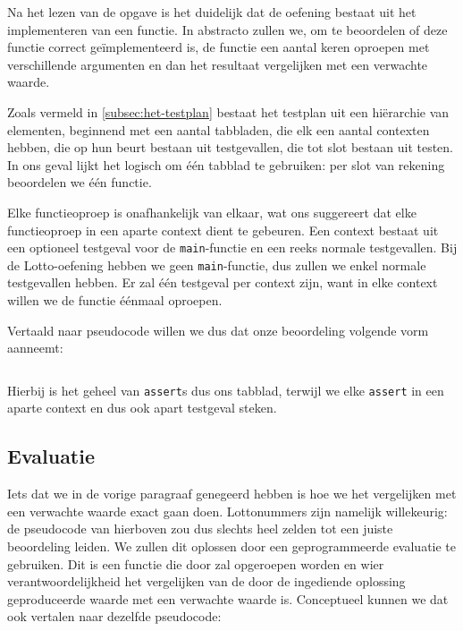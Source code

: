 Na het lezen van de opgave is het duidelijk dat de oefening bestaat uit het implementeren van een functie.
In abstracto zullen we, om te beoordelen of deze functie correct geïmplementeerd is, de functie een aantal keren oproepen met verschillende argumenten en dan het resultaat vergelijken met een verwachte waarde.

Zoals vermeld in \cref{subsec:het-testplan} bestaat het testplan uit een hiërarchie van elementen, beginnend met een aantal tabbladen, die elk een aantal contexten hebben, die op hun beurt bestaan uit testgevallen, die tot slot bestaan uit testen.
In ons geval lijkt het logisch om één tabblad te gebruiken: per slot van rekening beoordelen we één functie.

Elke functieoproep is onafhankelijk van elkaar, wat ons suggereert dat elke functieoproep in een aparte context dient te gebeuren.
Een context bestaat uit een optioneel testgeval voor de \texttt{main}-functie en een reeks normale testgevallen.
Bij de Lotto-oefening hebben we geen \texttt{main}-functie, dus zullen we enkel normale testgevallen hebben.
Er zal één testgeval per context zijn, want in elke context willen we de functie éénmaal oproepen.

Vertaald naar pseudocode willen we dus dat onze beoordeling volgende vorm aanneemt:

\inputminted{python}{code/lotto-eval.py}

Hierbij is het geheel van \texttt{assert}s dus ons tabblad, terwijl we elke \texttt{assert} in een aparte context en dus ook apart testgeval steken.

\subsection{Evaluatie}\label{subsec:oefening-lotto-evaluatie}

Iets dat we in de vorige paragraaf genegeerd hebben is hoe we het vergelijken met een verwachte waarde exact gaan doen.
Lottonummers zijn namelijk willekeurig: de pseudocode van hierboven zou dus slechts heel zelden tot een juiste beoordeling leiden.
We zullen dit oplossen door een geprogrammeerde evaluatie te gebruiken.
Dit is een functie die door \tested{} zal opgeroepen worden en wier verantwoordelijkheid het vergelijken van de door de ingediende oplossing geproduceerde waarde met een verwachte waarde is.
Conceptueel kunnen we dat ook vertalen naar dezelfde pseudocode:

\inputminted{python}{code/lotto-eval-programmed.py}

